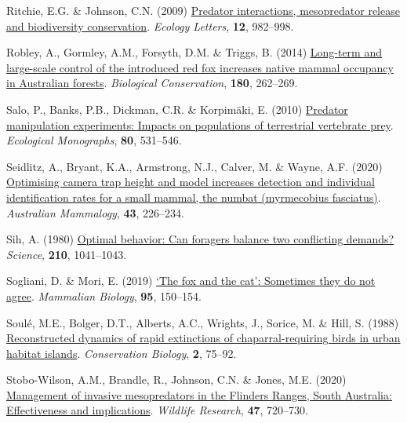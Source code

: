 \documentclass[preprint, 3p, authoryear]{elsarticle} %
\newlength{\cslhangindent}
\newlength{\cslentryspacingunit} %
\newenvironment{CSLReferences}[2] %
 {%
  \setlength{\parindent}{0pt}
  \ifodd #1
  \let\oldpar\par
  \def\par{\hangindent=\cslhangindent\oldpar}
  \fi
  \setlength{\parskip}{#2\cslentryspacingunit}
 }%
 {}
\begin{document}
\begin{CSLReferences}{1}{0}
\leavevmode{}%
Ritchie, E.G. \& Johnson, C.N. (2009) \href{https://doi.org/10.1111/j.1461-0248.2009.01347.x}{Predator interactions, mesopredator release and biodiversity conservation}. \emph{Ecology Letters}, \textbf{12}, 982--998.

\leavevmode{}%
Robley, A., Gormley, A.M., Forsyth, D.M. \& Triggs, B. (2014) \href{https://doi.org/10.1016/j.biocon.2014.10.017}{Long-term and large-scale control of the introduced red fox increases native mammal occupancy in {{A}ustralian} forests}. \emph{Biological Conservation}, \textbf{180}, 262--269.

\leavevmode{}%
Salo, P., Banks, P.B., Dickman, C.R. \& Korpimäki, E. (2010) \href{https://doi.org/10.1890/09-1260.1}{Predator manipulation experiments: Impacts on populations of terrestrial vertebrate prey}. \emph{Ecological Monographs}, \textbf{80}, 531--546.

\leavevmode{}%
Seidlitz, A., Bryant, K.A., Armstrong, N.J., Calver, M. \& Wayne, A.F. (2020) \href{https://doi.org/10.1071/AM20020}{Optimising camera trap height and model increases detection and individual identification rates for a small mammal, the numbat (myrmecobius fasciatus)}. \emph{Australian Mammalogy}, \textbf{43}, 226--234.

\leavevmode{}%
Sih, A. (1980) \href{https://doi.org/10.1126/science.210.4473.1041}{Optimal behavior: Can foragers balance two conflicting demands?} \emph{Science}, \textbf{210}, 1041--1043.

\leavevmode{}%
Sogliani, D. \& Mori, E. (2019) \href{https://doi.org/10.1016/j.mambio.2018.07.003}{{`The fox and the cat'}: Sometimes they do not agree}. \emph{Mammalian Biology}, \textbf{95}, 150--154.

\leavevmode{}%
Soulé, M.E., Bolger, D.T., Alberts, A.C., Wrights, J., Sorice, M. \& Hill, S. (1988) \href{https://doi.org/10.1111/j.1523-1739.1988.tb00337.x}{Reconstructed dynamics of rapid extinctions of chaparral-requiring birds in urban habitat islands}. \emph{Conservation Biology}, \textbf{2}, 75--92.

\leavevmode{}%
Stobo-Wilson, A.M., Brandle, R., Johnson, C.N. \& Jones, M.E. (2020) \href{https://doi.org/10.1071/WR19237}{Management of invasive mesopredators in the {Flinders Ranges, South {A}ustralia}: Effectiveness and implications}. \emph{Wildlife Research}, \textbf{47}, 720--730.


\end{CSLReferences}
\end{document}

